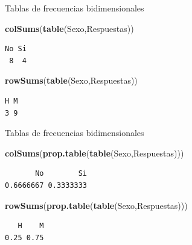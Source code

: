 \documentclass[
  ignorenonframetext,
  aspectratio=169]{beamer}
\newenvironment{Shaded}{\begin{snugshade}}{\end{snugshade}}
\newcommand{\FunctionTok}[1]{\textcolor[rgb]{0.13,0.29,0.53}{\textbf{#1}}}
\newcommand{\NormalTok}[1]{#1}
\begin{document}
\begin{frame}[fragile]{Tablas de frecuencias bidimensionales}
\label{tablas-de-frecuencias-bidimensionales-9}
\begin{Shaded}
\begin{Highlighting}[]
\FunctionTok{colSums}\NormalTok{(}\FunctionTok{table}\NormalTok{(Sexo,Respuestas)) }
\end{Highlighting}
\end{Shaded}

\begin{verbatim}
No Si 
 8  4 
\end{verbatim}

\begin{Shaded}
\begin{Highlighting}[]
\FunctionTok{rowSums}\NormalTok{(}\FunctionTok{table}\NormalTok{(Sexo,Respuestas)) }
\end{Highlighting}
\end{Shaded}

\begin{verbatim}
H M 
3 9 
\end{verbatim}
\end{frame}

\begin{frame}[fragile]{Tablas de frecuencias bidimensionales}
\label{tablas-de-frecuencias-bidimensionales-10}
\begin{Shaded}
\begin{Highlighting}[]
\FunctionTok{colSums}\NormalTok{(}\FunctionTok{prop.table}\NormalTok{(}\FunctionTok{table}\NormalTok{(Sexo,Respuestas)))}
\end{Highlighting}
\end{Shaded}

\begin{verbatim}
       No        Si 
0.6666667 0.3333333 
\end{verbatim}

\begin{Shaded}
\begin{Highlighting}[]
\FunctionTok{rowSums}\NormalTok{(}\FunctionTok{prop.table}\NormalTok{(}\FunctionTok{table}\NormalTok{(Sexo,Respuestas)))}
\end{Highlighting}
\end{Shaded}

\begin{verbatim}
   H    M 
0.25 0.75 
\end{verbatim}
\end{frame}
\end{document}
